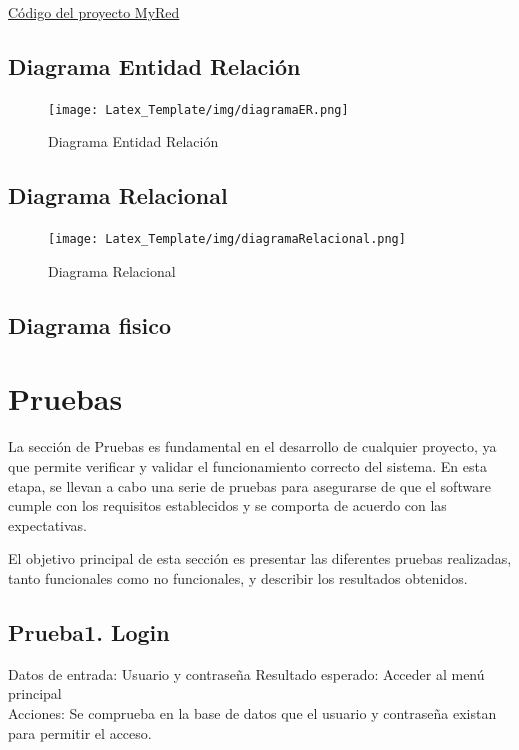 \documentclass[a4paper,12pt]{article}
\begin{document}
\href{https://gist.github.com/EugenioCCA/d96bc43e9fea3f9beb9c5ff4ac806b58}{Código del proyecto MyRed}

\subsection{Diagrama Entidad Relación}
\begin{figure}[ht]
  \centering
  \texttt{[image: Latex\_Template/img/diagramaER.png]}
    \caption{Diagrama Entidad Relación}
    \label{fig:image}
\end{figure}

\subsection{Diagrama Relacional}
\begin{figure}[ht]
  \centering
  \texttt{[image: Latex\_Template/img/diagramaRelacional.png]}
    \caption{Diagrama Relacional}
    \label{fig:image}
\end{figure}

\subsection{Diagrama fisico}


\newpage
\section{Pruebas}
La sección de Pruebas es fundamental en el desarrollo de cualquier proyecto, ya que permite verificar y validar el funcionamiento correcto del sistema. En esta etapa, se llevan a cabo una serie de pruebas para asegurarse de que el software cumple con los requisitos establecidos y se comporta de acuerdo con las expectativas.

El objetivo principal de esta sección es presentar las diferentes pruebas realizadas, tanto funcionales como no funcionales, y describir los resultados obtenidos.

\subsection{Prueba1. Login}
Datos de entrada: Usuario y contraseña
Resultado esperado: Acceder al menú principal\\

Acciones: Se comprueba en la base de datos que el usuario y contraseña existan para permitir el acceso.\\
\end{document}
